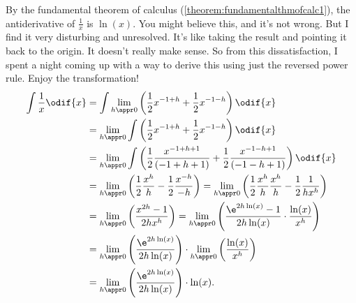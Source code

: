 By the fundamental theorem of calculus (\cref{theorem:fundamentalthmofcalc1}), the antiderivative of $\frac{1}{x}$ is $\ln(x)$. You might believe this, and it's not wrong. But I find it very disturbing and unresolved. It's like taking the result and pointing it back to the origin. It doesn't really make sense. So from this dissatisfaction, I spent a night coming up with a way to derive this using just the reversed power rule. Enjoy the transformation!
\begin{align}
	\int \frac{1}{x}\odif{x} & = \int\lim_{h \appr 0}\left(\frac{1}{2}x^{-1 + h} + \frac{1}{2}x^{-1 - h}\right)\odif{x} \nonumber                                                                                                \\
	                         & = \lim_{h \appr 0}\int\left(\frac{1}{2}x^{-1 + h} + \frac{1}{2}x^{-1 - h}\right)\odif{x} \nonumber                                                                                                \\
	                         & = \lim_{h \appr 0}\int\left(\frac{1}{2}\frac{x^{-1 + h + 1}}{(-1 + h + 1)} + \frac{1}{2}\frac{x^{-1 - h + 1}}{(-1 - h + 1)}\right)\odif{x} \nonumber                                              \\
	                         & = \lim_{h \appr 0}\left(\frac{1}{2}\frac{x^h}{h} - \frac{1}{2}\frac{x^{-h}}{-h}\right) = \lim_{h \appr 0}\left(\frac{1}{2}\frac{x^h}{h}\frac{x^h}{h} - \frac{1}{2}\frac{1}{hx^h}\right) \nonumber \\
	                         & = \lim_{h \appr 0}\left(\frac{x^{2h} - 1}{2hx^h}\right) = \lim_{h \appr 0}\left(\frac{\e^{2h\ln(x)} - 1}{2h\ln(x)}\cdot\frac{\ln(x)}{x^h}\right) \nonumber                                        \\
	                         & = \lim_{h \appr 0}\left(\frac{\e^{2h\ln(x)}}{2h\ln(x)}\right) \cdot \lim_{h \appr 0}\left(\frac{\ln(x)}{x^h}\right) \nonumber                                                                     \\
	                         & = \lim_{h \appr 0}\left(\frac{\e^{2h\ln(x)}}{2h\ln(x)}\right) \cdot \ln(x). \label{eq:logarithmsprove1}
\end{align}

